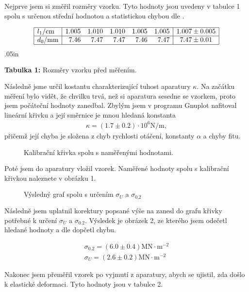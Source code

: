 \documentclass[a4paper,12pt]{article}
\begin{document}
Nejprve jsem si změřil rozměry vzorku. Tyto hodnoty jsou uvedeny v tabulce 1 spolu 
s určenou střední hodnotou a statistickou chybou dle \cite{4}.

$$
\begin{array}{|l|rrrrr|c|}
\hline
	l_1/\mbox{cm}&	1.005&	1.010&	1.010&	1.005&	1.005&	1.007 \pm 0.005	\\ \hline
	d_0/\mbox{mm}&	7.46&	7.47&	7.47&	7.46&	7.47&	7.47 \pm 0.01	\\ \hline
\end{array}
$$
\vglue.05in
\begin{center}
	\textbf{Tabulka 1:} Rozměry vzorku před měřením.
\end{center}


Následně jsme určil kostantu charakterizující tuhost aparatury $\kappa$. Na 
začátku měření bylo vidět, že chvilku trvá, než si aparatura sesedne se vzorkem, 
proto jsem počáteční hodnoty zanedbal. Zbylým jsem v programu Gnuplot nafitoval 
lineární křivku a její směrnice je mnou hledaná konstanta
\begin{eqnarray}
	\kappa=(1.7 \pm 0.2)\cdot 10^6 \mbox{N/m},
\end{eqnarray}
přičemž její chyba je složena z chyb rychlosti otáčení, konstanty $\alpha$ a chyby fitu.

\begin{figure}[!htb]
	
	\caption{Kalibrační křivka spolu s naměřenými hodnotami.}
	\label{garf1}
\end{figure}

Poté jsem do aparatury vložil vzorek. Naměřené hodnoty spolu s kalibrační křivkou 
naleznete v obrázku 1. 


\begin{figure}[!htb]

\caption{Výsledný graf spolu s určením $\sigma_U$ a $\sigma_{0.2}$}
\label{graf2}
\end{figure}

Následně jsem uplatnil korektury popsané výše na zanesl do grafu
křivky potřebné k určení $\sigma_U$ a $\sigma_{0.2}$. Výsledek je obrázek 2, ze kterého 
jsem odečetl hledané hodnoty a dle \cite{4} dopčetl chybu.

\begin{eqnarray}
	\sigma_{0.2}=(6.0 \pm 0.4) \mbox{MN}\cdot\mbox{m}^{-2} \\ 
	\sigma_U=(2.6 \pm 0.2) \mbox{MN}\cdot\mbox{m}^{-2}
\end{eqnarray}


Nakonec jsem přeměřil vzorek po vyjmutí z aparatury, abych se ujistil, zda došlo k elastické deformaci.
Tyto hodnoty jsou v tabulce 2.
\end{document}
